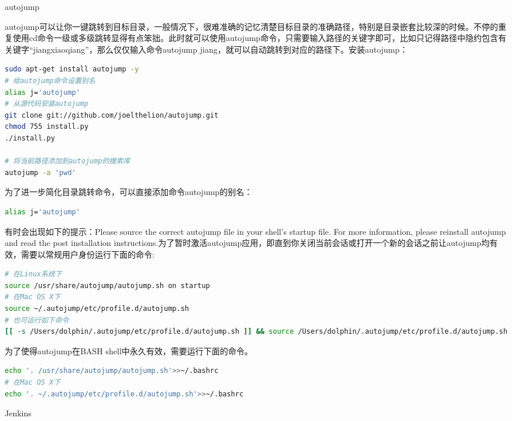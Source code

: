 \documentclass[12pt]{book}
\makeatletter
\numberwithin{dummy}{section}
\theoremstyle{ocrenumbox}
\theoremstyle{blacknumex}
\theoremstyle{blacknumbox}
\theoremstyle{ocrenum}
\renewcommand{\section}{\@startsection{section}{1}{\z@}
	{-4ex \@plus -1ex \@minus -.4ex}
	{1ex \@plus.2ex }
	{\normalfont\large\sffamily\bfseries}}
\renewcommand{\subsection}{\@startsection {subsection}{2}{\z@}
	{-3ex \@plus -0.1ex \@minus -.4ex}
	{0.5ex \@plus.2ex }
	{\normalfont\sffamily\bfseries}}
\makeatother
\begin{document}
\subsection{autojump}

autojump可以让你一键跳转到目标目录，一般情况下，很难准确的记忆清楚目标目录的准确路径，特别是目录嵌套比较深的时候。不停的重复使用cd命令一级或多级跳转显得有点笨拙。此时就可以使用autojump命令，只需要输入路径的关键字即可，比如只记得路径中隐约包含有关键字“jiangxiaoqiang”，那么仅仅输入命令autojump jiang，就可以自动跳转到对应的路径下。安装autojump：

\begin{lstlisting}[language=Bash]
sudo apt-get install autojump -y
# 给autojump命令设置别名
alias j='autojump'
# 从源代码安装autojump
git clone git://github.com/joelthelion/autojump.git
chmod 755 install.py
./install.py

# 将当前路径添加到autojump的搜索库
autojump -a 'pwd'
\end{lstlisting}

为了进一步简化目录跳转命令，可以直接添加命令autojump的别名：

\begin{lstlisting}[language=Bash]
alias j='autojump'
\end{lstlisting}

有时会出现如下的提示：Please source the correct autojump file in your shell's startup file. For more information, please reinstall autojump and read the post installation instructions.为了暂时激活autojump应用，即直到你关闭当前会话或打开一个新的会话之前让autojump均有效，需要以常规用户身份运行下面的命令:

\begin{lstlisting}[language=Bash]
# 在Linux系统下
source /usr/share/autojump/autojump.sh on startup
# 在Mac OS X下
source ~/.autojump/etc/profile.d/autojump.sh
# 也可运行如下命令
[[ -s /Users/dolphin/.autojump/etc/profile.d/autojump.sh ]] && source /Users/dolphin/.autojump/etc/profile.d/autojump.sh
\end{lstlisting}

为了使得autojump在BASH shell中永久有效，需要运行下面的命令。

\begin{lstlisting}[language=Bash]
echo '. /usr/share/autojump/autojump.sh'>>~/.bashrc
# 在Mac OS X下
echo '. ~/.autojump/etc/profile.d/autojump.sh'>>~/.bashrc
\end{lstlisting}


\section{Jenkins}
\end{document}

